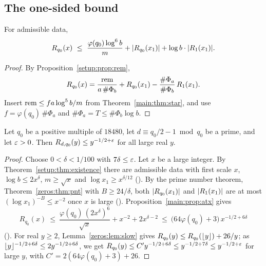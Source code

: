 \subsection{The one-sided bound}

\begin{proposition}\label{main:prop:atx}
For admissible data,
\[
  R_{q_0}(x) \ \le\ \frac{\varphi(q_0)\log^6 b}{m} + \abs{R_{q_0}(x_1)} + \log b\cdot\abs{R_1(x_1)} .
\]
\end{proposition}

\begin{proof}
By Proposition~\ref{setup:prop:rem},
\[
  R_{q_0}(x) = \frac{\mathrm{rem}}{a\,\#\Phi_b} + R_{q_0}(x_1) - \frac{\#\Phi_a}{\#\Phi_b}\,R_1(x_1).
\]
Insert $\mathrm{rem} \le f a\log^5 b/m$ from Theorem~\ref{main:thm:star}, and use
$f = \varphi(q_0)\,\#\Phi_a$ and $\#\Phi_a = T \le \#\Phi_b\log b$.
\end{proof}

\begin{theorem}
\label{main:thm:onesided}
Let $q_0$ be a positive multiple of $18480$, let $d \equiv q_0/2 - 1 \bmod q_0$ be a prime, and
let $\varepsilon > 0$. Then $R_{d,q_0}(y) \le y^{-1/2+\varepsilon}$ for all large real $y$.
\end{theorem}

\begin{proof}
Choose $0 < \delta < 1/100$ with $7\delta \le \varepsilon$. Let $x$ be a large integer. By
Theorem~\ref{setup:thm:existence} there are admissible data with first scale $x$,
$\log b \le 2x^\delta$, $m \ge \sqrt{x}$ and $\log x_1 \ge x^{\delta/12}$
(). By the prime number
theorem, Theorem~\ref{zeros:thm:pnt} with $B \ge 24/\delta$, both $\lvert R_{q_0}(x_1)\rvert$ and
$\lvert R_1(x_1)\rvert$ are at most $(\log x_1)^{-B} \le x^{-2}$ once $x$ is large
(). Proposition~\ref{main:prop:atx} gives
\[
  R_{q_0}(x) \ \le\ \frac{\varphi(q_0)\,(2x^\delta)^6}{\sqrt{x}} + x^{-2} + 2x^{\delta-2}
  \ \le\ \bigl(64\varphi(q_0) + 3\bigr)\,x^{-1/2+6\delta}
\]
(). For real $y \ge 2$,
Lemma~\ref{zeros:lem:slow} gives $R_{q_0}(y) \le R_{q_0}(\lfloor y\rfloor) + 26/y$; as
$\lfloor y\rfloor^{-1/2+6\delta} \le 2y^{-1/2+6\delta}$, we get $R_{q_0}(y) \le C' y^{-1/2+6\delta}
\le y^{-1/2+7\delta} \le y^{-1/2+\varepsilon}$ for large $y$, with $C' = 2(64\varphi(q_0)+3) + 26$.
\end{proof}

